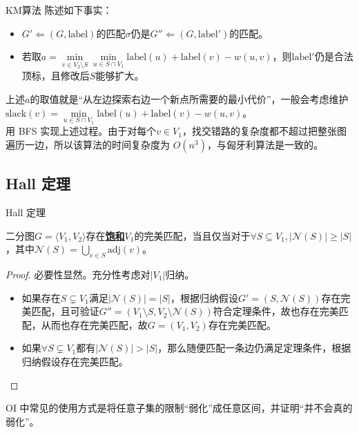 \documentclass{beamer}
\def\obj#1{\textbf{\uline{#1}}}
\def\ge{\geqslant}
\begin{document}
\begin{frame}{KM算法}
	陈述如下事实：
	\begin{itemize}
		\item $G' \Leftarrow (G, \mathrm{label})$的匹配$\sigma$仍是$G'' \Leftarrow (G, \mathrm{label}')$的匹配。
		\item 若取$a = \min\limits_{v \in V_2 \setminus S} \min\limits_{u \in S \cap V_1} \textrm{label}(u) + \mathrm{label}(v) - w(u, v)$，则$\mathrm{label}'$仍是合法顶标，且修改后$S$能够扩大。
	\end{itemize}

	上述$a$的取值就是“从左边探索右边一个新点所需要的最小代价”，一般会考虑维护$\mathrm{slack}(v) = \min\limits_{u \in S \cap V_1} \textrm{label}(u) + \mathrm{label}(v) - w(u, v)$。\\

	用 BFS 实现上述过程。由于对每个$v \in V_1$，找交错路的复杂度都不超过把整张图遍历一边，所以该算法的时间复杂度为 $O(n^3)$，与匈牙利算法是一致的。

\end{frame}


\subsection{Hall 定理}
\begin{frame}{Hall 定理}
	\begin{theorem}
		二分图$G = \langle V_1, V_2 \rangle $存在\obj{饱和}$V_1$的完美匹配，当且仅当对于$\forall S \subseteq V_1, |\mathcal N(S)| \ge |S|$，其中$\mathcal N(S) = \bigcup_{v \in S}\mathrm{adj}(v)$。
	\end{theorem}
	\begin{proof}
		必要性显然。充分性考虑对$|V_1|$归纳。
		\begin{itemize}
			\item 如果存在$S \subsetneq V_1$满足$|\mathcal N(S)| = |S|$，根据归纳假设$G' = (S, \mathcal N(S))$存在完美匹配，且可验证$G'' = (V_1 \setminus S, V_2 \setminus \mathcal N(S))$符合定理条件，故也存在完美匹配，从而也存在完美匹配，故$G = (V_1, V_2)$存在完美匹配。
			\item 如果$\forall S \subsetneq V_1$都有$|\mathcal N(S)| > |S|$，那么随便匹配一条边仍满足定理条件，根据归纳假设存在完美匹配。
		\end{itemize}
	\end{proof}

	OI 中常见的使用方式是将任意子集的限制“弱化”成任意区间，并证明“并不会真的弱化”。
	
\end{frame}
\end{document}
